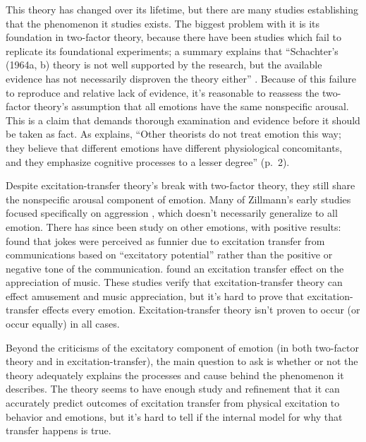 \documentclass[
  stu]{apa7}
\begin{document}
This theory has changed over its lifetime, but there are many studies
establishing that the phenomenon it studies exists. The biggest problem
with it is its foundation in two-factor theory, because there have been
studies which fail to replicate its foundational experiments; a summary
explains that ``Schachter's (1964a, b) theory is not well supported by
the research, but the available evidence has not necessarily disproven
the theory either'' \autocite[ 1]{cotReviewResearchSchachter}. Because
of this failure to reproduce and relative lack of evidence, it's
reasonable to reassess the two-factor theory's assumption that all
emotions have the same nonspecific arousal. This is a claim that demands
thorough examination and evidence before it should be taken as fact. As
\textcite{cotReviewResearchSchachter} explains, ``Other theorists do not
treat emotion this way; they believe that different emotions have
different physiological concomitants, and they emphasize cognitive
processes to a lesser degree'' (p.~2).

Despite excitation-transfer theory's break with two-factor theory, they
still share the nonspecific arousal component of emotion. Many of
Zillmann's early studies focused specifically on aggression
\autocite{zilExcitationTransferCommunicationmediated,zilExcitationTransferPhysical,zilEffectResidualExcitation},
which doesn't necessarily generalize to all emotion. There has since
been study on other emotions, with positive results:
\textcite{canEnhancementHumorAppreciation} found that jokes were
perceived as funnier due to excitation transfer from communications
based on ``excitatory potential'' rather than the positive or negative
tone of the communication. \textcite{canEffectAffectiveState} found an
excitation transfer effect on the appreciation of music. These studies
verify that excitation-transfer theory can effect amusement and music
appreciation, but it's hard to prove that excitation-transfer effects
every emotion. Excitation-transfer theory isn't proven to occur (or
occur equally) in all cases.

Beyond the criticisms of the excitatory component of emotion (in both
two-factor theory and in excitation-transfer), the main question to ask
is whether or not the theory adequately explains the processes and cause
behind the phenomenon it describes. The theory seems to have enough
study and refinement that it can accurately predict outcomes of
excitation transfer from physical excitation to behavior and emotions,
but it's hard to tell if the internal model for why that transfer
happens is true.
\end{document}
